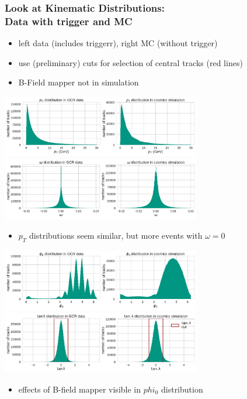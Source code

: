 \documentclass[18pt]{beamer}
\begin{document}
  \begin{frame}
    \frametitle{Look at Kinematic Distributions:\\Data with trigger and MC}
    \begin{itemize}
    \item left data (includes triggerr), right MC (without trigger)
    \item use (preliminary) cuts for selection of central tracks (red lines)
    \item B-Field mapper not in simulation
    \end{itemize}
    \begin{center}
      \includegraphics[width=0.65\textwidth]{figures/distributions/gcr_pt_distribution_uncut.pdf}\\
      \includegraphics[width=0.65\textwidth]{figures/distributions/gcr_omega_distribution_uncut.pdf}
    \end{center}
    \begin{itemize}
    \item $p_T$ distributions seem similar, but more events with $\omega = 0$
    \end{itemize}
  \end{frame}

  \begin{frame}
    \begin{center}
      \includegraphics[width=0.65\textwidth]{figures/distributions/gcr_phi0_distribution_uncut.pdf}\\
      \includegraphics[width=0.65\textwidth]{figures/distributions/gcr_tan_lambda_distribution_uncut.pdf}
    \end{center}

    \begin{itemize}
    \item effects of B-field mapper visible in $phi_0$ distribution
    \end{itemize}
  \end{frame}
\end{document}
